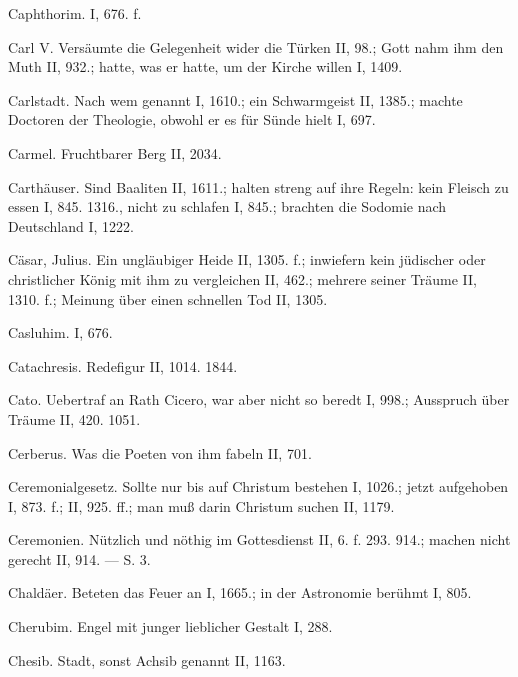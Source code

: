 Caphthorim. I, 676. f.

Carl V. Versäumte die Gelegenheit wider die Türken II, 98.; Gott nahm ihm den Muth II, 932.; hatte, was er hatte, um der Kirche willen I, 1409.

Carlstadt. Nach wem genannt I, 1610.; ein Schwarmgeist II, 1385.; machte Doctoren der Theologie, obwohl er es für Sünde hielt I, 697.

Carmel. Fruchtbarer Berg II, 2034.

Carthäuser. Sind Baaliten II, 1611.; halten streng auf ihre Regeln: kein Fleisch zu essen I, 845. 1316., nicht zu schlafen I, 845.; brachten die Sodomie nach Deutschland I, 1222.

Cäsar, Julius. Ein ungläubiger Heide II, 1305. f.; inwiefern kein jüdischer oder christlicher König mit ihm zu vergleichen II, 462.; mehrere seiner Träume II, 1310. f.; Meinung über einen schnellen Tod II, 1305.

Casluhim. I, 676.

Catachresis. Redefigur II, 1014. 1844.

Cato. Uebertraf an Rath Cicero, war aber nicht so beredt I, 998.; Ausspruch über Träume II, 420. 1051.

Cerberus. Was die Poeten von ihm fabeln II, 701.

Ceremonialgesetz. Sollte nur bis auf Christum bestehen I, 1026.; jetzt aufgehoben I, 873. f.; II, 925. ff.; man muß darin Christum suchen II, 1179.

Ceremonien. Nützlich und nöthig im Gottesdienst II, 6. f. 293. 914.; machen nicht gerecht II, 914. — S.  3.

Chaldäer. Beteten das Feuer an I, 1665.; in der Astronomie berühmt I, 805.

Cherubim. Engel mit junger lieblicher Gestalt I, 288.

Chesib. Stadt, sonst Achsib genannt II, 1163.


